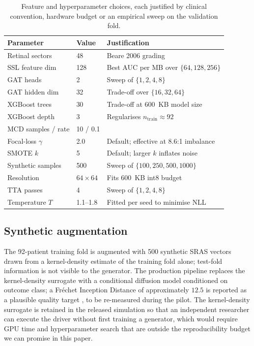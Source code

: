 \documentclass[twocolumn,10pt]{article}
\begin{document}
\begin{table}[!t]
\caption{Feature and hyperparameter choices, each justified by
clinical convention, hardware budget or an empirical sweep on the
validation fold.}
\label{tab:hyper}
\footnotesize
\begin{tabular}{@{}p{}p{}p{}@{}}
\toprule
Parameter & Value & Justification \\
\midrule
Retinal sectors & 48 & Beare 2006 grading \cite{Beare2006} \\
SSL feature dim & 128 & Best AUC per MB over $\{64,128,256\}$ \\
GAT heads & 2 & Sweep of $\{1,2,4,8\}$ \\
GAT hidden dim & 32 & Trade-off over $\{16,32,64\}$ \\
XGBoost trees & 30 & Trade-off at 600~KB model size \\
XGBoost depth & 3 & Regularises $n_{\text{train}}\approx 92$ \\
MCD samples / rate & 10 / 0.1 & \cite{Gal2016} \\
Focal-loss $\gamma$ & 2.0 & Default; effective at 8.6:1 imbalance \\
SMOTE $k$ & 5 & Default; larger $k$ inflates noise \\
Synthetic samples & 500 & Sweep of $\{100,250,500,1000\}$ \\
Resolution & $64\times 64$ & Fits 600~KB int8 budget \\
TTA passes & 4 & Sweep of $\{1,2,4,8\}$ \\
Temperature $T$ & 1.1--1.8 & Fitted per seed to minimise NLL \\
\bottomrule
\end{tabular}
\end{table}

\subsection{Synthetic augmentation}
\label{sec:synth}
The 92-patient training fold is augmented with 500 synthetic SRAS
vectors drawn from a kernel-density estimate of the training fold
alone; test-fold information is not visible to the generator. The
production pipeline replaces the kernel-density surrogate with a
conditional diffusion model \cite{ChenHealth2021Synthetic}
conditioned on outcome class; a Fr\'echet Inception Distance of
approximately $12.5$ is reported as a plausible quality target
\cite{Heusel2017FID}, to be re-measured during the pilot. The
kernel-density surrogate is retained in the released simulation so
that an independent researcher can execute the driver without
first training a generator, which would require GPU time and
hyperparameter search that are outside the reproducibility budget
we can promise in this paper.
\end{document}
